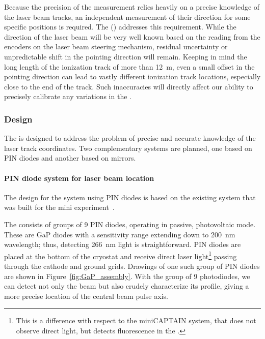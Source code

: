 
Because the precision of the \efield measurement relies heavily on a precise knowledge of the laser beam tracks, an independent measurement of their direction for some specific positions is required. The  () addresses this requirement. 
While the direction of the laser beam will be very well known based on the reading from the encoders on the laser beam steering mechanism,  residual uncertainty or unpredictable shift in the pointing direction will remain. 
Keeping in mind the long length of the ionization track of more than \SI{12}{\m}, even a small offset in the pointing direction can lead to vastly different ionization track locations, especially close to the end of the track. Such inaccuracies will directly affect our ability to precisely calibrate any variations in the \efield.

\subsubsection{Design}
The  is designed to address the problem of precise and accurate knowledge of the laser track coordinates. 
Two complementary systems are planned, one based on PIN diodes and another based on mirrors.

\paragraph{PIN diode system for laser beam location}
The design for the system using PIN diodes is based on the existing system that was built for the mini experiment~\cite{Berns:2013usa}.

The  consists of groups of \num{9} PIN diodes, operating in passive, photovoltaic mode. These are GaP diodes with a sensitivity range extending down to  \SI{200}{\nano\m} wavelength; thus, detecting \SI{266}{\nano\m} light is straightforward. %
PIN diodes are placed at the bottom of the cryostat and receive direct laser light\footnote{This is a difference with respect to the miniCAPTAIN system, that does not observe direct light, but detects fluorescence in the \frfour.} passing through the cathode and ground grids. Drawings of one such group of PIN diodes are shown in Figure~\ref{fig:GaP_assembly}. With the group of \num{9} photodiodes, we can detect not only the beam but also crudely characterize its profile, giving a more precise location of the central beam pulse axis. 


